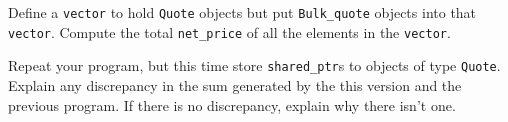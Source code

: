 %
%
\begin{question}
Define a \verb|vector| to hold \verb|Quote| objects but put
\verb|Bulk_quote| objects into that \verb|vector|. Compute the total \verb|net_price| of all
the elements in the \verb|vector|.
\end{question}

\begin{question}
Repeat your program, but this time store \verb|shared_ptr|s to
objects of type \verb|Quote|. Explain any discrepancy in the sum generated by the
this version and the previous program. If there is no discrepancy, explain why
there isn’t one.
\end{question}
